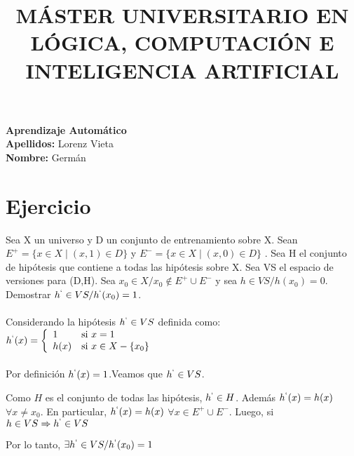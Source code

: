 \documentclass{article}
\title{\textbf{MÁSTER UNIVERSITARIO EN
LÓGICA, COMPUTACIÓN E INTELIGENCIA ARTIFICIAL}}
\date{}
\begin{document}
\maketitle
\begin{flushleft}
\textbf{Aprendizaje Automático}
\\\textbf{Apellidos:} Lorenz Vieta
\\\textbf{Nombre:} Germán
\end{flushleft}


\section{Ejercicio}
Sea X un universo y D un conjunto de entrenamiento sobre X. Sean \(E^+ = \{ x \in X \mid(x,1) \in D\}\)  y \(E^- = \{ x \in X \mid(x,0)\in D \}\) . Sea H el conjunto de hipótesis que contiene a todas las hipótesis sobre X. Sea VS el espacio de versiones para (D,H). Sea \( x_0 \in X / x_0 \notin E^+ \cup E^- \) y sea \(h \in VS/h(x_0) = 0\). Demostrar \(h^` \in VS/h^`(x_0) = 1\).\\\\
Considerando la hipótesis \(h^`\in VS\) definida como:
\(h^`(x) =
\left\{
	\begin{array}{ll}
		1  & \mbox{si } x = 1 \\
		h(x) & \mbox{si } x \in X - \{x_0\}
	\end{array}
\right.
\)\\\\
 Por definición \(h^`(x) = 1\).Veamos que \(h^` \in VS\). 
 \begin{flushleft}Como \(H\) es el conjunto de todas las hipótesis, \(h^` \in H\). Además \(h^`(x) = h(x)\) \(\forall x \neq x_0\). En particular, \(h^`(x) = h(x)\) \(\forall x \in E^+ \cup E^-\). Luego, si \(h \in VS \Rightarrow h^`\in VS\)
 \end{flushleft}
 \begin{center}
 Por lo tanto, \(\exists h^` \in VS / h^`(x_0) = 1\)
 \end{center}
\end{document}
